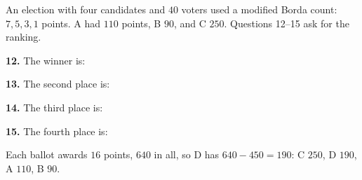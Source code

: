 \documentclass[12pt]{ximera}
\begin{document}
\begin{problem}
An election with four candidates and $40$ voters used a modified Borda count: $7,5,3,1$ points. A had $110$ points, B $90$, and C $250$. Questions 12--15 ask for the ranking.

\begin{prompt}
\textbf{12.} The winner is:
\begin{multipleChoice}
\end{multipleChoice}
\end{prompt}

\begin{prompt}
\textbf{13.} The second place is:
\begin{multipleChoice}
\end{multipleChoice}
\end{prompt}

\begin{prompt}
\textbf{14.} The third place is:
\begin{multipleChoice}
\end{multipleChoice}
\end{prompt}

\begin{prompt}
\textbf{15.} The fourth place is:
\begin{multipleChoice}
\end{multipleChoice}
\begin{feedback}
Each ballot awards $16$ points, $640$ in all, so D has $640-450=190$: C $250$, D $190$, A $110$, B $90$.
\end{feedback}
\end{prompt}
\end{problem}
\end{document}
